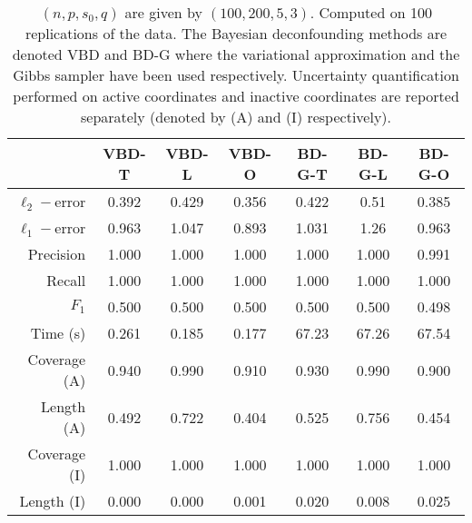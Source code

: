 \documentclass[11pt]{article}
\numberwithin{equation}{section}
\begin{document}
\begin{table}[h]
\centering
\begin{tabular}{r|ccc|ccc}
\toprule
               & VBD-T & VBD-L & VBD-O & BD-G-T & BD-G-L & BD-G-O \\ \hline
$\ell_2-$error & 0.392   & 0.429   & 0.356   & 0.422  & 0.51   & 0.385 \\
$\ell_1-$error & 0.963   & 1.047   & 0.893   & 1.031  & 1.26   & 0.963 \\ \hline
Precision      & 1.000   & 1.000   & 1.000   & 1.000  & 1.000  & 0.991 \\
Recall         & 1.000   & 1.000   & 1.000   & 1.000  & 1.000  & 1.000 \\
$F_1$          & 0.500   & 0.500   & 0.500   & 0.500  & 0.500  & 0.498 \\ \hline
Time (s)       & 0.261   & 0.185   & 0.177   & 67.23  & 67.26  & 67.54 \\ \hline
Coverage (A)   & 0.940   & 0.990   & 0.910   & 0.930  & 0.990  & 0.900 \\
Length (A)     & 0.492   & 0.722   & 0.404   & 0.525  & 0.756  & 0.454 \\ \hline
Coverage (I)   & 1.000   & 1.000   & 1.000   & 1.000  & 1.000  & 1.000 \\
Length (I)     & 0.000   & 0.000   & 0.001   & 0.020  & 0.008  & 0.025 \\
\bottomrule
\end{tabular}
\caption{$(n, p, s_0, q) $ are given by $(100, 200, 5, 3)$. Computed on 100  replications of the data. The Bayesian deconfounding methods are denoted VBD and BD-G where the variational approximation and the Gibbs sampler have been used respectively. Uncertainty quantification performed on active coordinates and inactive coordinates are reported separately (denoted by (A) and (I) respectively).}
\label{Tab:UQ_oracle}
\end{table}
\end{document}
